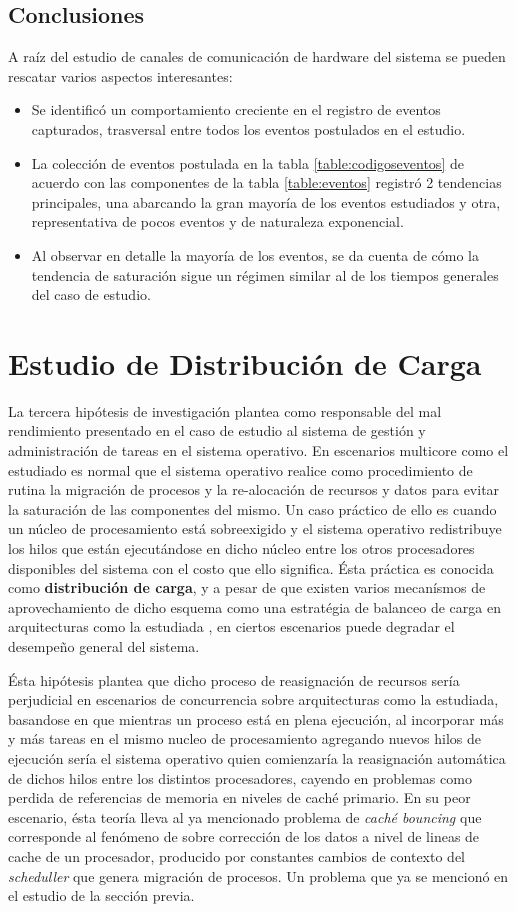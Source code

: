 \subsection{Conclusiones}
A raíz del estudio de canales de comunicación de hardware del sistema se pueden rescatar varios aspectos interesantes:
\begin{itemize}
\item Se identificó un comportamiento creciente en el registro de eventos capturados, trasversal entre todos los eventos postulados en el estudio.
\item La colección de eventos postulada en la tabla \ref{table:codigoseventos} de acuerdo con las componentes de la tabla \ref{table:eventos} registró 2 tendencias principales, una abarcando la gran mayoría de los eventos estudiados y otra, representativa de pocos eventos y de naturaleza exponencial.
\item Al observar en detalle la mayoría de los eventos, se da cuenta de cómo la tendencia de saturación sigue un régimen similar al de los tiempos generales del caso de estudio.
\end{itemize}

\section{Estudio de Distribución de Carga}
La tercera hipótesis de investigación plantea como responsable del mal rendimiento presentado en el caso de estudio al sistema de gestión y administración de tareas en el sistema operativo. En escenarios multicore como el estudiado es normal que el sistema operativo realice como procedimiento de rutina la migración de procesos y la re-alocación de recursos y datos para evitar la saturación de las componentes del mismo. Un caso práctico de ello es cuando un núcleo de procesamiento está sobreexigido y el sistema operativo redistribuye los hilos que están ejecutándose en dicho núcleo entre los otros procesadores disponibles del sistema con el costo que ello significa. Ésta práctica es conocida como \textbf{distribución de carga}, y a pesar de que existen varios mecanísmos de aprovechamiento de dicho esquema como una estratégia de balanceo de carga en arquitecturas como la estudiada \cite{paper:NUMA}, en ciertos escenarios puede degradar el desempeño general del sistema.

Ésta hipótesis plantea que dicho proceso de reasignación de recursos sería perjudicial en escenarios de concurrencia sobre arquitecturas como la estudiada, basandose en que mientras un proceso está en plena ejecución, al incorporar más y más tareas en el mismo nucleo de procesamiento agregando nuevos hilos de ejecución sería el sistema operativo quien comienzaría la reasignación automática de dichos hilos entre los distintos procesadores, cayendo en problemas como perdida de referencias de memoria en niveles de caché primario. En su peor escenario, ésta teoría lleva al ya mencionado problema de \emph{caché bouncing} \cite{paper:cachebouncing} que corresponde al fenómeno de sobre corrección de los datos a nivel de lineas de cache de un procesador, producido por constantes cambios de contexto del \emph{scheduller} que genera migración de procesos. Un problema que ya se mencionó en el estudio de la sección previa.


